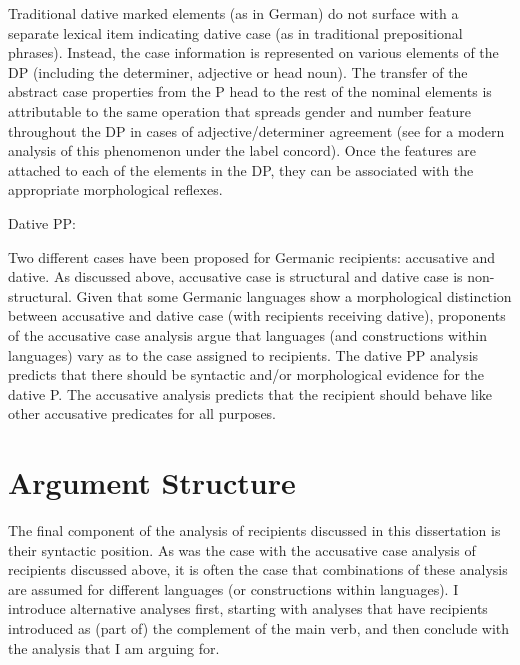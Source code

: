 Traditional dative marked elements (as in German) do not surface with a separate lexical item indicating dative case (as in traditional prepositional phrases). Instead, the case information is represented on various elements of the DP (including the determiner, adjective or head noun). The transfer of the abstract case properties from the P head to the rest of the nominal elements is attributable to the same operation that spreads gender and number feature throughout the DP in cases of adjective/determiner agreement (see \citealt{Norris.2012} for a modern analysis of this phenomenon under the label concord). Once the features are attached to each of the elements in the DP, they can be associated with the appropriate morphological reflexes.

\begin{exe}
\ex Dative PP: \\
\end{exe}

Two different cases have been proposed for Germanic recipients: accusative and dative. As discussed above, accusative case is structural and dative case is non-structural. Given that some Germanic languages show a morphological distinction between accusative and dative case (with recipients receiving dative), proponents of the accusative case analysis argue that languages (and constructions within languages) vary as to the case assigned to recipients. The dative PP analysis predicts that there should be syntactic and/or morphological evidence for the dative P. The accusative analysis predicts that the recipient should behave like other accusative predicates for all purposes.

\section{Argument Structure}
The final component of the analysis of recipients discussed in this dissertation is their syntactic position. As was the case with the accusative case analysis of recipients discussed above, it is often the case that combinations of these analysis are assumed for different languages (or constructions within languages). I introduce alternative analyses first, starting with analyses that have recipients introduced as (part of) the complement of the main verb, and then conclude with the analysis that I am arguing for.

